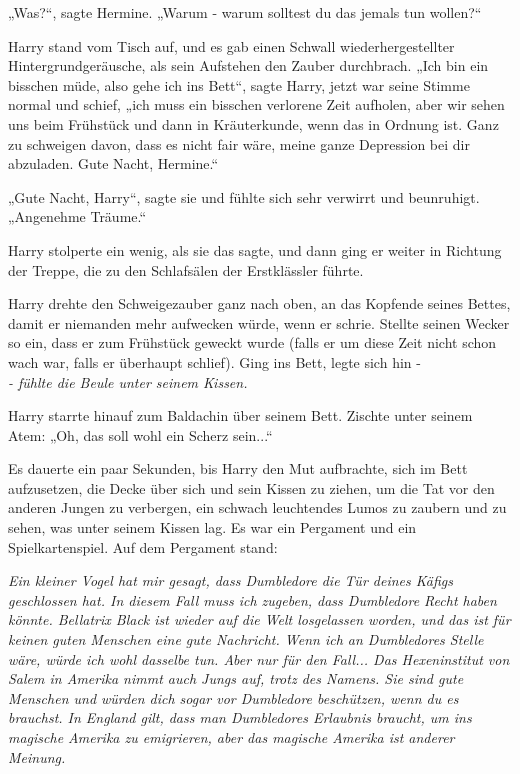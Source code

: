 {„Was?“, sagte Hermine. „Warum - warum solltest du das jemals tun wollen?“

Harry stand vom Tisch auf, und es gab einen Schwall wiederhergestellter Hintergrundgeräusche, als sein Aufstehen den Zauber durchbrach. „Ich bin ein bisschen müde, also gehe ich ins Bett“, sagte Harry, jetzt war seine Stimme normal und schief, „ich muss ein bisschen verlorene Zeit aufholen, aber wir sehen uns beim Frühstück und dann in Kräuterkunde, wenn das in Ordnung ist. Ganz zu schweigen davon, dass es nicht fair wäre, meine ganze Depression bei dir abzuladen. Gute Nacht, Hermine.“

„Gute Nacht, Harry“, sagte sie und fühlte sich sehr verwirrt und beunruhigt. „Angenehme Träume.“

Harry stolperte ein wenig, als sie das sagte, und dann ging er weiter in Richtung der Treppe, die zu den Schlafsälen der Erstklässler führte.

Harry drehte den Schweigezauber ganz nach oben, an das Kopfende seines Bettes, damit er niemanden mehr aufwecken würde, wenn er schrie. Stellte seinen Wecker so ein, dass er zum Frühstück geweckt wurde (falls er um diese Zeit nicht schon wach war, falls er überhaupt schlief). Ging ins Bett, legte sich hin -\\ \emph{\hfill\break - fühlte die Beule unter seinem Kissen.}

Harry starrte hinauf zum Baldachin über seinem Bett. Zischte unter seinem Atem: „Oh, das soll wohl ein Scherz sein...“

Es dauerte ein paar Sekunden, bis Harry den Mut aufbrachte, sich im Bett aufzusetzen, die Decke über sich und sein Kissen zu ziehen, um die Tat vor den anderen Jungen zu verbergen, ein schwach leuchtendes Lumos zu zaubern und zu sehen, was unter seinem Kissen lag. Es war ein Pergament und ein Spielkartenspiel. Auf dem Pergament stand:

\emph{Ein kleiner Vogel hat mir gesagt, dass Dumbledore die Tür deines Käfigs geschlossen hat. In diesem Fall muss ich zugeben, dass Dumbledore Recht haben könnte. Bellatrix Black ist wieder auf die Welt losgelassen worden, und das ist für keinen guten Menschen eine gute Nachricht. Wenn ich an Dumbledores Stelle wäre, würde ich wohl dasselbe tun. Aber nur für den Fall... Das Hexeninstitut von Salem in Amerika nimmt auch Jungs auf, trotz des Namens. Sie sind gute Menschen und würden dich sogar vor Dumbledore beschützen, wenn du es brauchst. In England gilt, dass man Dumbledores Erlaubnis braucht, um ins magische Amerika zu emigrieren, aber das magische Amerika ist anderer Meinung.}

}
